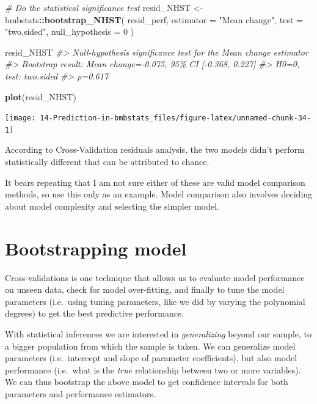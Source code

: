 \documentclass[
]{book}
\newenvironment{Shaded}{\begin{snugshade}}{\end{snugshade}}
\newcommand{\CommentTok}[1]{\textcolor[rgb]{0.56,0.35,0.01}{\textit{#1}}}
\newcommand{\DataTypeTok}[1]{\textcolor[rgb]{0.13,0.29,0.53}{#1}}
\newcommand{\DecValTok}[1]{\textcolor[rgb]{0.00,0.00,0.81}{#1}}
\newcommand{\KeywordTok}[1]{\textcolor[rgb]{0.13,0.29,0.53}{\textbf{#1}}}
\newcommand{\NormalTok}[1]{#1}
\newcommand{\OperatorTok}[1]{\textcolor[rgb]{0.81,0.36,0.00}{\textbf{#1}}}
\newcommand{\StringTok}[1]{\textcolor[rgb]{0.31,0.60,0.02}{#1}}
\begin{document}
\begin{Shaded}
\begin{Highlighting}[]
\CommentTok{\# Do the statistical significance test}
\NormalTok{resid\_NHST <{-}}\StringTok{ }\NormalTok{bmbstats}\OperatorTok{::}\KeywordTok{bootstrap\_NHST}\NormalTok{(}
\NormalTok{  resid\_perf,}
  \DataTypeTok{estimator =} \StringTok{"Mean change"}\NormalTok{,}
  \DataTypeTok{test =} \StringTok{"two.sided"}\NormalTok{,}
  \DataTypeTok{null\_hypothesis =} \DecValTok{0}
\NormalTok{)}

\NormalTok{resid\_NHST}
\CommentTok{\#> Null{-}hypothesis significance test for the \textasciigrave{}Mean change\textasciigrave{} estimator}
\CommentTok{\#> Bootstrap result: Mean change={-}0.075, 95\% CI [{-}0.368, 0.227]}
\CommentTok{\#> H0=0, test: two.sided}
\CommentTok{\#> p=0.617}
\end{Highlighting}
\end{Shaded}

\begin{Shaded}
\begin{Highlighting}[]
\KeywordTok{plot}\NormalTok{(resid\_NHST)}
\end{Highlighting}
\end{Shaded}

\begin{center}\texttt{[image: 14-Prediction-in-bmbstats\_files/figure-latex/unnamed-chunk-34-1]} \end{center}

According to Cross-Validation residuals analysis, the two models didn't perform statistically different that can be attributed to chance.

It bears repeating that I am not sure either of these are valid model comparison methods, so use this only as an example. Model comparison also involves deciding about model complexity and selecting the simpler model.

\hypertarget{bootstrapping-model}{%
\section{Bootstrapping model}\label{bootstrapping-model}}

Cross-validations is one technique that allows us to evaluate model performance on unseen data, check for model over-fitting, and finally to tune the model parameters (i.e.~using tuning parameters, like we did by varying the polynomial degrees) to get the best predictive performance.

With statistical inferences we are interested in \emph{generalizing} beyond our sample, to a bigger population from which the sample is taken. We can generalize model parameters (i.e.~intercept and slope of parameter coefficients), but also model performance (i.e.~what is the \emph{true} relationship between two or more variables). We can thus bootstrap the above model to get confidence intervals for both parameters and performance estimators.
\end{document}
